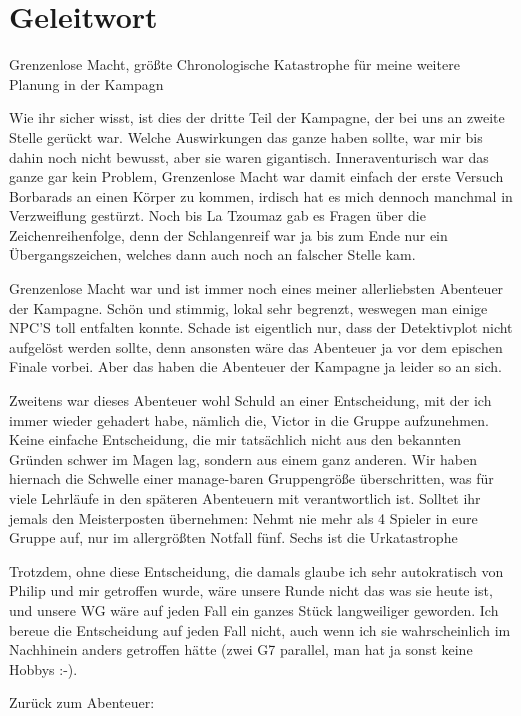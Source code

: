 \documentclass[11pt]{scrreprt}
\begin{document}
\section{Geleitwort}
Grenzenlose Macht, größte Chronologische Katastrophe für meine weitere Planung in der Kampagn\par
Wie ihr sicher wisst, ist dies der dritte Teil der Kampagne, der bei uns an zweite Stelle gerückt war. Welche Auswirkungen das ganze haben sollte, war mir bis dahin noch nicht bewusst, aber sie waren gigantisch. Inneraventurisch war das ganze gar kein Problem, Grenzenlose Macht war damit einfach der erste Versuch Borbarads an einen Körper zu kommen, irdisch hat es mich dennoch manchmal in Verzweiflung gestürzt. Noch bis La Tzoumaz gab es Fragen über die Zeichenreihenfolge, denn der Schlangenreif war ja bis zum Ende nur ein Übergangszeichen, welches dann auch noch an falscher Stelle kam.\par
Grenzenlose Macht war und ist immer noch eines meiner allerliebsten Abenteuer der Kampagne. Schön und stimmig, lokal sehr begrenzt, weswegen man einige NPC'S toll entfalten konnte. Schade ist eigentlich nur, dass der Detektivplot  nicht aufgelöst werden sollte, denn ansonsten wäre das Abenteuer ja vor dem epischen Finale vorbei. Aber das haben die Abenteuer der Kampagne ja leider so an sich.\par
Zweitens war dieses Abenteuer wohl Schuld an einer Entscheidung, mit der ich immer wieder gehadert habe, nämlich die, Victor in die Gruppe aufzunehmen. Keine einfache Entscheidung, die mir tatsächlich nicht aus den bekannten Gründen schwer im Magen lag, sondern aus einem ganz anderen. Wir haben hiernach die Schwelle einer manage-baren Gruppengröße überschritten, was für viele Lehrläufe in den späteren Abenteuern mit verantwortlich ist. Solltet ihr jemals den Meisterposten übernehmen: Nehmt nie mehr als 4 Spieler in eure Gruppe auf, nur im allergrößten Notfall fünf. Sechs ist die Urkatastrophe\par
Trotzdem, ohne diese Entscheidung, die damals glaube ich sehr autokratisch von Philip und mir getroffen wurde, wäre unsere Runde nicht das was sie heute ist, und unsere WG wäre auf jeden Fall ein ganzes Stück langweiliger geworden. Ich bereue die Entscheidung auf jeden Fall nicht, auch wenn ich sie wahrscheinlich im Nachhinein anders getroffen hätte (zwei G7 parallel, man hat ja sonst keine Hobbys :-).\par
Zurück zum Abenteuer: \par
\end{document}
